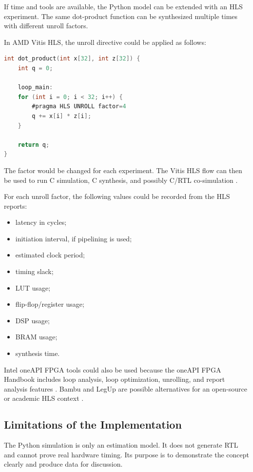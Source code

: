 \documentclass[conference]{IEEEtran}
\begin{document}
If time and tools are available, the Python model can be extended with an HLS experiment. The same dot-product function can be synthesized multiple times with different unroll factors.

In AMD Vitis HLS, the unroll directive could be applied as follows:

\begin{lstlisting}[language=C]
int dot_product(int x[32], int z[32]) {
    int q = 0;

    loop_main:
    for (int i = 0; i < 32; i++) {
        #pragma HLS UNROLL factor=4
        q += x[i] * z[i];
    }

    return q;
}
\end{lstlisting}

The factor would be changed for each experiment. The Vitis HLS flow can then be used to run C simulation, C synthesis, and possibly C/RTL co-simulation \cite{vitis2026}.

For each unroll factor, the following values could be recorded from the HLS reports:

\begin{itemize}
    \item latency in cycles;
    \item initiation interval, if pipelining is used;
    \item estimated clock period;
    \item timing slack;
    \item LUT usage;
    \item flip-flop/register usage;
    \item DSP usage;
    \item BRAM usage;
    \item synthesis time.
\end{itemize}

Intel oneAPI FPGA tools could also be used because the oneAPI FPGA Handbook includes loop analysis, loop optimization, unrolling, and report analysis features \cite{inteloneapi2024}. Bambu and LegUp are possible alternatives for an open-source or academic HLS context \cite{bambu,legup2021}.

\subsection{Limitations of the Implementation}

The Python simulation is only an estimation model. It does not generate RTL and cannot prove real hardware timing. Its purpose is to demonstrate the concept clearly and produce data for discussion.
\end{document}
